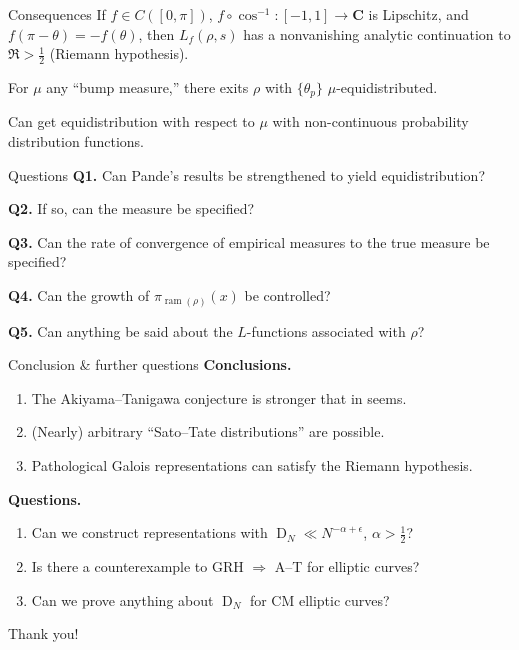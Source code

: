 \documentclass{beamer}
\DeclareMathOperator{\D}{D}
\DeclareMathOperator{\ram}{ram}
\newcommand{\bC}{\mathbf{C}}
\begin{document}
\begin{frame}{Consequences}
If $f\in C([0,\pi])$, $f\circ \cos^{-1}\colon [-1,1]\to \bC$ is Lipschitz, and 
$f(\pi-\theta) = - f(\theta)$, then $L_f(\rho,s)$ has a nonvanishing analytic 
continuation to $\Re > \frac 1 2$ (Riemann hypothesis). 
\pause

For $\mu$ any ``bump measure,'' there exits $\rho$ with $\{\theta_p\}$ 
$\mu$-equidistributed. 
\pause

Can get equidistribution with respect to $\mu$ with non-continuous probability 
distribution functions.
\end{frame}



\begin{frame}{Questions}
\textbf{Q1.} Can Pande's results be strengthened to yield equidistribution? 

\textbf{Q2.} If so, can the measure be specified?

\textbf{Q3.} Can the rate of convergence of empirical measures to the true measure 
be specified?

\textbf{Q4.} Can the growth of $\pi_{\ram(\rho)}(x)$ be controlled?

\textbf{Q5.} Can anything be said about the $L$-functions associated with $\rho$?
\end{frame}



\begin{frame}{Conclusion \& further questions}
\textbf{Conclusions.}
\pause
\begin{enumerate}
\item
The Akiyama--Tanigawa conjecture is stronger that in seems.
\pause

\item
(Nearly) arbitrary ``Sato--Tate distributions'' are possible.
\pause

\item
Pathological Galois representations can satisfy the Riemann hypothesis.
\end{enumerate}
\pause

\textbf{Questions.}
\pause
\begin{enumerate}
\item
Can we construct representations with $\D_N \ll N^{-\alpha+\epsilon}$, 
$\alpha > \frac 1 2$?
\pause

\item
Is there a counterexample to GRH $\Rightarrow$ A--T for elliptic curves?
\pause

\item
Can we prove anything about $\D_N$ for CM elliptic curves?
\end{enumerate}
\end{frame}



\begin{frame}
\begin{center}
\Huge Thank you!
\end{center}
\end{frame}
\end{document}
